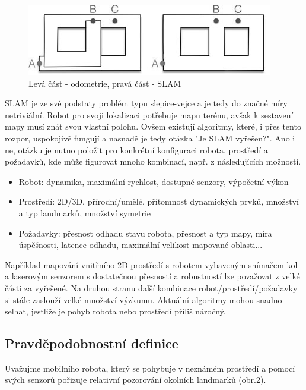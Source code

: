 \documentclass[12pt,a4paper]{article}
\begin{document}
\begin{figure}[H]
\centering
\includegraphics[scale=1]{img/Obr1_b} 
\caption{Levá část - odometrie, pravá část - SLAM} 
\end{figure}


\newpage
SLAM je ze své podstaty problém typu slepice-vejce a je tedy do značné míry netriviální. Robot pro svoji lokalizaci potřebuje mapu terénu, avšak k sestavení mapy musí znát svou vlastní polohu. Ovšem existují algoritmy, které, i přes tento rozpor, uspokojivě fungují a nasnadě je tedy otázka "Je SLAM vyřešen?". Ano i ne, otázku je nutno položit pro konkrétní konfiguraci robota, prostředí a požadavků, kde může figurovat mnoho kombinací, např. z následujících možností.
\begin{itemize}
\item Robot: dynamika, maximální rychlost, dostupné senzory, výpočetní výkon
\item Prostředí: 2D/3D, přírodní/umělé, přítomnost dynamických prvků, množství a typ landmarků, množství symetrie
\item Požadavky: přesnost odhadu stavu robota, přesnost a typ mapy, míra úspěšnosti, latence odhadu, maximální velikost mapované oblasti...
\end{itemize}
Například mapování vnitřního 2D prostředí s robotem vybaveným snímačem kol a laserovým senzorem s dostatečnou přesností a robustností lze považovat z velké části za vyřešené. Na druhou stranu další kombinace robot/prostředí/požadavky si stále zaslouží velké množství výzkumu. Aktuální algoritmy mohou snadno selhat, jestliže je pohyb robota nebo prostředí příliš náročný.


\subsection{Pravděpodobnostní definice}
Uvažujme mobilního robota, který se pohybuje v neznámém prostředí a pomocí svých senzorů pořizuje relativní pozorování okolních landmarků (obr.2).
\end{document}
